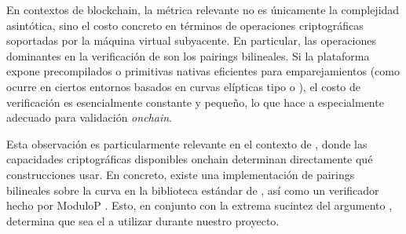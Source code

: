 En contextos de blockchain, la métrica relevante no es únicamente la complejidad asintótica, sino el costo concreto en términos de operaciones criptográficas soportadas por la máquina virtual subyacente. En particular, las operaciones dominantes en la verificación de \Groth son los pairings bilineales. Si la plataforma expone precompilados o primitivas nativas eficientes para emparejamientos (como ocurre en ciertos entornos basados en curvas elípticas tipo \BN o \BLS), el costo de verificación es esencialmente constante y pequeño, lo que hace a \Groth especialmente adecuado para validación \textit{onchain}.

Esta observación es particularmente relevante en el contexto de \Cardano, donde las capacidades criptográficas disponibles onchain determinan directamente qué construcciones \zkSNARK usar. En concreto, existe una implementación de pairings bilineales sobre la curva \BLS en la biblioteca estándar de \Plutus, así como un verificador \Groth hecho por ModuloP \cite{groth_validator_modulop}. Esto, en conjunto con la extrema sucintez del argumento \Groth, determina que sea el \zkSNARK a utilizar durante nuestro proyecto.
